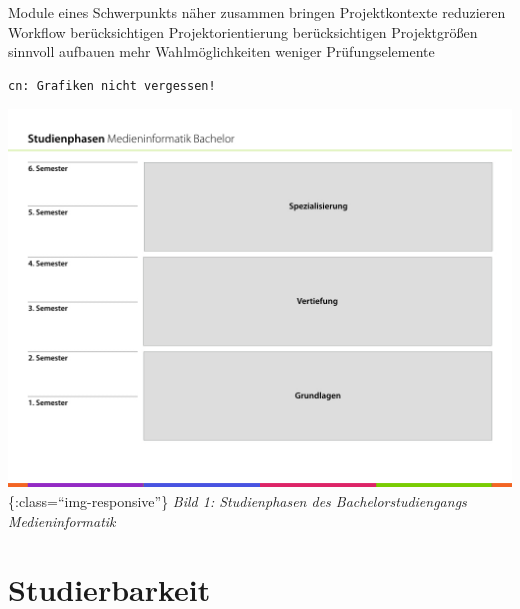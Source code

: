 Module eines Schwerpunkts näher zusammen bringen Projektkontexte
reduzieren Workflow berücksichtigen Projektorientierung berücksichtigen
Projektgrößen sinnvoll aufbauen mehr Wahlmöglichkeiten weniger
Prüfungselemente

\begin{verbatim}
cn: Grafiken nicht vergessen!
\end{verbatim}

\includegraphics{../anhaenge/bilder/ba-studienphasen.001.jpeg}\{:class=``img-responsive''\}
\emph{Bild 1: Studienphasen des Bachelorstudiengangs Medieninformatik}

\chapter{Studierbarkeit}\label{studierbarkeit}

